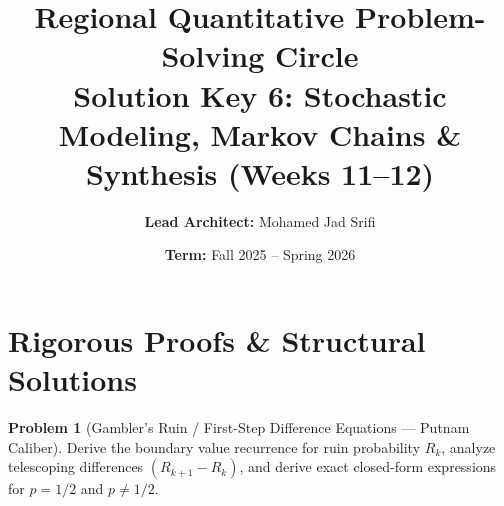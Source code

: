 \documentclass[11pt, a4paper]{article}
\theoremstyle{definition}
\newtheorem{problem}{Problem}
\theoremstyle{plain}
\begin{document}
\title{\vspace{-1.5cm}\textbf{Regional Quantitative Problem-Solving Circle} \\ \Large Solution Key 6: Stochastic Modeling, Markov Chains \& Synthesis (Weeks 11--12)}
\author{\textbf{Lead Architect:} Mohamed Jad Srifi}
\date{\textbf{Term:} Fall 2025 -- Spring 2026}
\maketitle

\section*{Rigorous Proofs \& Structural Solutions}

\begin{problem}[Gambler's Ruin / First-Step Difference Equations --- Putnam Caliber]
Derive the boundary value recurrence for ruin probability $R_k$, analyze telescoping differences $(R_{k+1} - R_k)$, and derive exact closed-form expressions for $p = 1/2$ and $p \ne 1/2$.
\end{problem}
\end{document}
